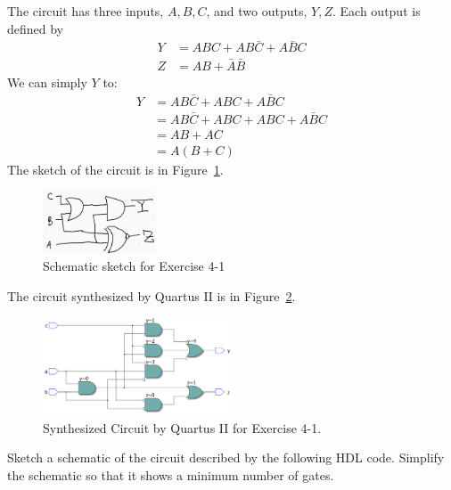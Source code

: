 \documentclass[12pt]{article}
\newenvironment{ex}[2][Exercise]{\begin{trivlist}
		\item[\hskip \labelsep {\bfseries #1}\hskip \labelsep {\bfseries #2.}]}{\end{trivlist}}
\newenvironment{sol}[1][Solution]{\begin{trivlist}
		\item[\hskip \labelsep {\bfseries #1:}]}{\end{trivlist}}
\begin{document}
\begin{sol}
	The circuit has three inputs, $A,B,C$, and two outputs, $Y,Z$.
	Each output is defined by
	\begin{align*}
		Y&=ABC+AB\bar{C}+A\bar{B}C\\
		Z&=AB+\bar{A}\bar{B}
	\end{align*}
	We can simply $Y$ to:
	\begin{align*}
		Y&=AB\bar{C}+ABC+A\bar{B}C\\
		&=AB\bar{C}+ABC+ABC+A\bar{B}C\\
		&=AB+AC\\
		&=A(B+C)
	\end{align*}
	The sketch of the circuit is in Figure~\ref{04-01-circuit-sketch}.
	\begin{figure}
		\centering
		\includegraphics[width=0.3\textwidth]{04-01-circuit-sketch}
		\caption{Schematic sketch for Exercise 4-1}
		\label{04-01-circuit-sketch}
	\end{figure}
	The circuit synthesized by Quartus II is in Figure~\ref{04-01-synth-circuit}.
	\begin{figure}
		\centering
		\includegraphics[width=0.5\textwidth]{04-01-synth-circuit}
		\caption{Synthesized Circuit by Quartus II for Exercise 4-1.}
		\label{04-01-synth-circuit}
	\end{figure}
\end{sol}

\begin{ex}{4.2}
	Sketch a schematic of the circuit described by the following HDL
	code. Simplify the schematic so that it shows a minimum number
	of gates.
	
\end{ex}
\end{document}
